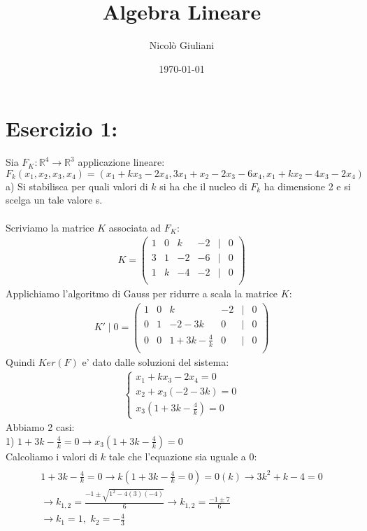 \documentclass{article}
\title{Algebra Lineare}
\author{Nicolò Giuliani}
\date{\today}
\begin{document}
\section*{Esercizio 1:}
Sia $F_K : \mathbb{R}^4 \to \mathbb{R}^3$ applicazione lineare:
\begin{equation*}
    F_k(x_1,x_2,x_3,x_4)=(x_1+kx_3-2x_4, 3x_1+x_2-2x_3-6x_4, x_1+kx_2-4x_3-2x_4)
\end{equation*}
a)  Si stabilisca per quali valori di $k$ si ha che il nucleo di $F_k$ ha dimensione 2 e si scelga un tale valore s. \\
\vspace{1em}
\\Scriviamo la matrice $K$ associata ad $F_K$:
\begin{align*}
    K = \begin{pmatrix}
        1 & 0 & k & -2 & | & 0 \\
        3 & 1 & -2 & -6 & | & 0 \\
        1 & k & -4 & -2 & | & 0 \\
    \end{pmatrix}
\end{align*}
Applichiamo l'algoritmo di Gauss per ridurre a scala la matrice $K$:
\begin{align*}
    K'\mid 0= 
    \begin{pmatrix}
        1 & 0 & k & -2 & | & 0 \\
        0 & 1 & -2-3k & 0 & | & 0 \\
        0 & 0 & 1+3k-\frac{4}{k} & 0 & | & 0 \\
    \end{pmatrix}
\end{align*}
Quindi $Ker(F)$ e' dato dalle soluzioni del sistema:
\begin{align*}
    \begin{cases}
        x_1+kx_3-2x_4=0 \\
        x_2+x_3(-2-3k)=0 \\
        x_3(1+3k-\frac{4}{k})=0
    \end{cases}
\end{align*}
Abbiamo 2 casi:
\\1) $1+3k-\frac{4}{k}=0 \to x_3(1+3k-\frac{4}{k})=0$ 
\\Calcoliamo i valori di $k$ tale che l'equazione sia uguale a 0:
\begin{align*}
    \\
    1+3k-\frac{4}{k}=0 \to k( 1+3k-\frac{4}{k}=0 )=0(k)\to 3k^2+k-4=0
    \\\to k_{1,2}=\frac{-1 \pm \sqrt{1^2 - 4(3)(-4)}}{6} \to k_{1,2}=\frac{-1 \pm 7}{6}
    \\\to k_1=1, \, \, k_2=-\frac{4}{3}
\end{align*}
\end{document}
